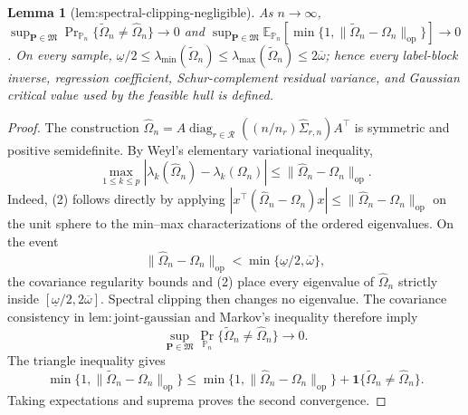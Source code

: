 \documentclass{article}
\newtheorem{lemma}{Lemma}
\begin{document}
\begin{lemma}[lem:spectral-clipping-negligible]\label{lem:spectral-clipping-negligible}
As \(n\to\infty\), \(\sup_{\mathbf P\in\mathfrak M}\Pr_{\mathbb P_n}\{\widetilde\Omega_n\ne\widehat\Omega_n\}\to0\) and \(\sup_{\mathbf P\in\mathfrak M}\mathbb E_{\mathbb P_n}[\min\{1,\|\widetilde\Omega_n-\Omega_n\|_{\mathrm{op}}\}]\to0\). On every sample, \(\underline\omega/2\le\lambda_{\min}(\widetilde\Omega_n)\le\lambda_{\max}(\widetilde\Omega_n)\le2\overline\omega\); hence every label-block inverse, regression coefficient, Schur-complement residual variance, and Gaussian critical value used by the feasible hull is defined.
\end{lemma}
\begin{proof}
The construction \(\widehat\Omega_n=A\operatorname{diag}_{r\in\mathcal R}((n/n_r)\widehat\Sigma_{r,n})A^{\top}\) is symmetric and positive semidefinite.  By Weyl's elementary variational inequality,
\[
 \max_{1\le k\le p}
 |\lambda_k(\widehat\Omega_n)-\lambda_k(\Omega_n)|
 \le\|\widehat\Omega_n-\Omega_n\|_{\mathrm{op}}.
\tag{2}
\]
Indeed, (2) follows directly by applying
\(
 |x^{\top}(\widehat\Omega_n-\Omega_n)x|
 \le\|\widehat\Omega_n-\Omega_n\|_{\mathrm{op}}
\)
on the unit sphere to the min--max characterizations of the ordered eigenvalues.  On the event
\[
 \|\widehat\Omega_n-\Omega_n\|_{\mathrm{op}}
 <\min\{\underline\omega/2,\overline\omega\},
\]
the covariance regularity bounds and (2) place every eigenvalue of \(\widehat\Omega_n\) strictly inside \([\underline\omega/2,2\overline\omega]\).  Spectral clipping then changes no eigenvalue.  The covariance consistency in \(\mathrm{lem:joint\text{-}gaussian}\) and Markov's inequality therefore imply
\[
 \sup_{\mathbf P\in\mathfrak M}
 \Pr_{\mathbb P_n}\{\widetilde\Omega_n\ne\widehat\Omega_n\}
 \longrightarrow0.
\]
The triangle inequality gives
\[
 \min\{1,\|\widetilde\Omega_n-\Omega_n\|_{\mathrm{op}}\}
 \le
 \min\{1,\|\widehat\Omega_n-\Omega_n\|_{\mathrm{op}}\}
 +\mathbf 1\{\widetilde\Omega_n\ne\widehat\Omega_n\}.
\]
Taking expectations and suprema proves the second convergence.


\end{proof}
\end{document}
